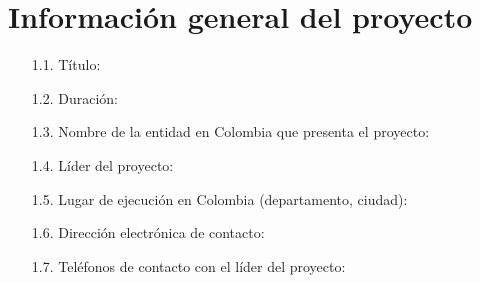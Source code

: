 
\section{Información general del proyecto}
\begin{itemize}
\item[1.1.] Título:
\item[1.2.] Duración:
\item[1.3.] Nombre de la entidad en Colombia que presenta el proyecto:
\item[1.4.] Líder del proyecto:
\item[1.5.] Lugar de ejecución en Colombia (departamento, ciudad):
\item[1.6.] Dirección electrónica de contacto:
\item[1.7.] Teléfonos de contacto con el líder del proyecto:
\end{itemize}

